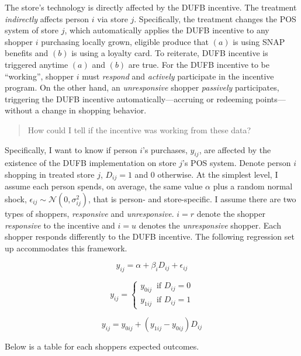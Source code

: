 \documentclass[12pt,letterpaperpaper,]{book}
\begin{document}
The store's technology is directly affected by the DUFB incentive. The
treatment \emph{indirectly} affects person \(i\) via store \(j\).
Specifically, the treatment changes the POS system of store \(j\), which
automatically applies the DUFB incentive to any shopper \(i\) purchasing
locally grown, eligible produce that \((a)\) is using SNAP benefits and
\((b)\) is using a loyalty card. To reiterate, DUFB incentive is
triggered anytime \((a)\) and \((b)\) are true. For the DUFB incentive
to be ``working'', shopper \(i\) must \emph{respond} and \emph{actively}
participate in the incentive program. On the other hand, an
\emph{unresponsive} shopper \emph{passively} participates, triggering
the DUFB incentive automatically---accruing or redeeming
points---without a change in shopping behavior.

\begin{quote}
How could I tell if the incentive was working from these data?
\end{quote}

Specifically, I want to know if person \(i\)'s purchases, \(y_{ij}\),
are affected by the existence of the DUFB implementation on store
\(j\)'s POS system. Denote person \(i\) shopping in treated store \(j\),
\(D_{ij}=1\) and \(0\) otherwise. At the simplest level, I assume each
person spends, on average, the same value \(\alpha\) plus a random
normal shock, \(\epsilon_{ij} \sim \mathcal{N}(0, \sigma_{ij}^2)\), that
is person- and store-specific. I assume there are two types of shoppers,
\emph{responsive} and \emph{unresponsive}. \(i = r\) denote the shopper
\emph{responsive} to the incentive and \(i = u\) denotes the
\emph{unresponsive} shopper. Each shopper responds differently to the
DUFB incentive. The following regression set up accommodates this
framework.

\[
  y_{ij} = \alpha + \beta_i D_{ij} + \epsilon_{ij}
\]

\[
y_{ij} = 
\begin{cases}
  y_{0ij}~\text{ if }D_{ij} = 0 \\
  y_{1ij}~\text{ if }D_{ij} = 1
\end{cases}
\]

\[
y_{ij} = y_{0ij} + (y_{1ij} - y_{0ij})D_{ij}
\]

Below is a table for each shoppers expected outcomes.
\end{document}
